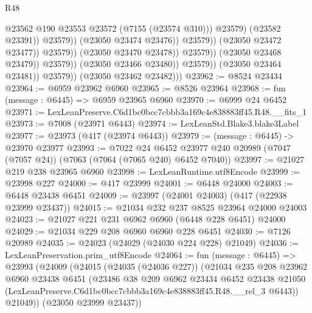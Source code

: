 \begin{lexlean}{R48}
\begin{coremodule}
                                                      @23562
                                                      @190
                                                      @23553
                                                      @23572
                                                      (@7155 (@23574 @310)))
                                                    @23579)
                                                  (@23582 @23391))
                                                @23579))
                                            (@23050 @23474 @23476))
                                          @23579))
                                      (@23050 @23472 @23477))
                                    @23579))
                                (@23050 @23470 @23478))
                              @23579))
                          (@23050 @23468 @23479))
                        @23579))
                    (@23050 @23466 @23480))
                  @23579))
              (@23050 @23464 @23481))
            @23579))
        (@23050 @23462 @23482)))
@23962 := @8524 @23434
@23964 := @6959 @23962 @6960
@23965 := @8526 @23964
@23968 := fun (message : @6445) => @6959 @23965 @6960
@23970 := @6999 @24 @6452
@23971 := LexLeanPreserve.C6d1bc0bcc7cbbb3a169c4e838883ff45.R48.__fits_1
@23973 := @7008 (@23971 @6443)
@23974 := LexLeanStd.Blake3.blake3Label
@23977 := @23973 (@417 (@23974 @6443))
@23979 := (message : @6445) -> @23970 @23977
@23993 := @7022
    @24
    @6452
    @23977
    @240
    @20989
    (@7047 (@7057 @24))
    (@7063 (@7064 (@7065 @240) @6452 @7040))
@23997 := @21027 @219 @238 @23965 @6960
@23998 := LexLeanRuntime.utf8Encode
@23999 := @23998 @227
@24000 := @417 @23999
@24001 := @6448 @24000
@24003 := @6448 @23438 @6451
@24009 := @23997 (@24001 @24003) (@417 (@22938 @23999 @23437))
@24015 := @21034 @232 @237 @8525 @23964 @24000 @24003
@24023 := @21027 @221 @231 @6962 @6960 (@6448 @228 @6451) @24000
@24029 := @21034 @229 @208 @6960 @6960 @228 @6451
@24030 := @7126 @20989
@24035 := @24023 (@24029 (@24030 @224 @228) @21049)
@24036 := LexLeanPreservation.prim_utf8Encode
@24064 := fun (message : @6445) =>
  @23993
    (@24009
      (@24015
        (@24035 (@24036 @227))
        (@21034
          @235
          @208
          @23962
          @6960
          @23438
          @6451
          (@23486
            @38
            @209
            @6962
            @23434
            @6452
            @23438
            @21050
            (LexLeanPreserve.C6d1bc0bcc7cbbb3a169c4e838883ff45.R48.__rel_3 @6443))
          @21049))
      (@23050 @23999 @23437))

\end{coremodule}
\end{lexlean}
